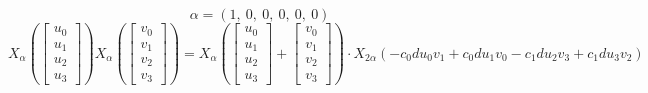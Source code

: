 \documentclass[11pt]{article}
\theoremstyle{definition}
\begin{document}
\[
\alpha = \left( 1, \  0, \  0, \  0, \  0, \  0\right)
\]
\[
X_{\alpha}\left(\left[\begin{matrix}u_{0}\\u_{1}\\u_{2}\\u_{3}\end{matrix}\right]\right) X_{\alpha}\left(\left[\begin{matrix}v_{0}\\v_{1}\\v_{2}\\v_{3}\end{matrix}\right]\right) = X_{\alpha}\left(\left[\begin{matrix}u_{0}\\u_{1}\\u_{2}\\u_{3}\end{matrix}\right] + \left[\begin{matrix}v_{0}\\v_{1}\\v_{2}\\v_{3}\end{matrix}\right]\right) \cdot X_{2\alpha}\left(- c_{0} d u_{0} v_{1} + c_{0} d u_{1} v_{0} - c_{1} d u_{2} v_{3} + c_{1} d u_{3} v_{2}\right)
\]
\end{document}
